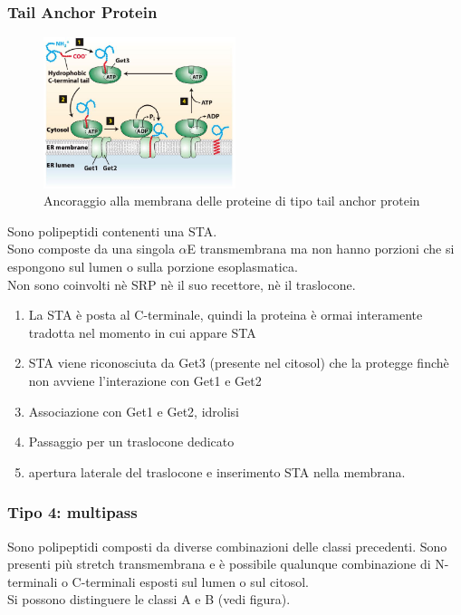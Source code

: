         \subsubsection{Tail Anchor Protein}
            \begin{figure}[h]
                \centering
                \includegraphics[width=0.5\textwidth]{images/TailAnchrProt.JPG}
                \caption{\small Ancoraggio alla membrana delle proteine di tipo tail anchor protein}
                \label{fig:mesh1}
            \end{figure}
            Sono polipeptidi contenenti una STA.\\
            Sono composte da una singola $\alpha$E transmembrana ma non hanno porzioni che si espongono sul lumen o sulla porzione esoplasmatica.\\
            Non sono coinvolti nè SRP nè il suo recettore, nè il traslocone.
            \begin{enumerate}
                \item La STA è posta al C-terminale, quindi la proteina è ormai interamente tradotta nel momento in cui appare STA
                \item STA viene riconosciuta da Get3 (presente nel citosol) che la protegge finchè non avviene l'interazione con Get1 e Get2
                \item Associazione con Get1 e Get2, idrolisi
                \item Passaggio per un traslocone dedicato
                \item apertura laterale del traslocone e inserimento STA nella membrana.
            \end{enumerate}
            
        \subsubsection{Tipo 4: multipass}
            Sono polipeptidi composti da diverse combinazioni delle classi precedenti. Sono presenti più stretch transmembrana e è possibile qualunque combinazione di N-terminali o C-terminali esposti sul lumen o sul citosol.\\
            Si possono distinguere le classi A e B (vedi figura).
            
